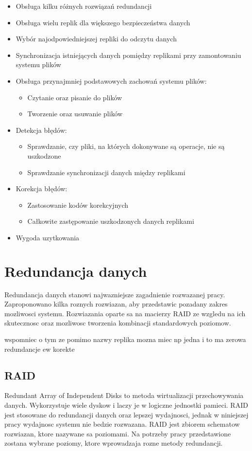 \begin{itemize}
    \item Obsługa kilku różnych rozwiązań redundancji
    \item Obsługa wielu replik dla większego bezpieczeństwa danych 
    \item Wybór najodpowiedniejszej repliki do odczytu danych
    \item Synchronizacja istniejących danych pomiędzy replikami przy zamontowaniu systemu plików
	\item Obsługa przynajmniej podstawowych zachowań systemu plików:
		\begin{itemize}
			\item Czytanie oraz pisanie do plików
			\item Tworzenie oraz usuwanie plików
		\end{itemize}
	\item Detekcja błędów:
		\begin{itemize}
			\item Sprawdzanie, czy pliki, na których dokonywane są operacje, nie są uszkodzone
			\item Sprawdzanie synchronizacji danych między replikami
		\end{itemize}
	\item Korekcja błędów:
		\begin{itemize}
			\item Zastosowanie kodów korekcyjnych
			\item Całkowite zastępowanie uszkodzonych danych replikami
		\end{itemize}
    \item Wygoda uzytkowania
\end{itemize}

\section {Redundancja danych}
Redundancja danych stanowi najwazniejsze zagadnienie rozwazanej pracy. Zaproponowano kilka roznych rozwiazan, aby przedstawic pozadany zakres mozliwosci systemu. Rozwiazania oparte sa na macierzy RAID ze wzgledu na ich skutecznosc oraz mozliwosc tworzenia kombinacji standardowych poziomow.

wspomniec o tym ze pomimo nazwy replika mozna miec np jedna i to ma zerowa redundancje ew korekte
\subsection {RAID}
Redundant Array of Independent Disks to metoda wirtualizacji przechowywania danych. Wykorzystuje wiele dyskow i laczy je w logiczne jednostki pamieci. RAID jest stosowane do redundancji danych oraz lepszej wydajnosci, jednak w niniejszej pracy wydajnosc systemu nie bedzie rozwazana.  
RAID jest zbiorem schematow rozwiazan, ktore nazywane sa poziomami. Na potrzeby pracy przedstawione zostana wybrane poziomy, ktore wprowadzaja rozne metody redundancji.
